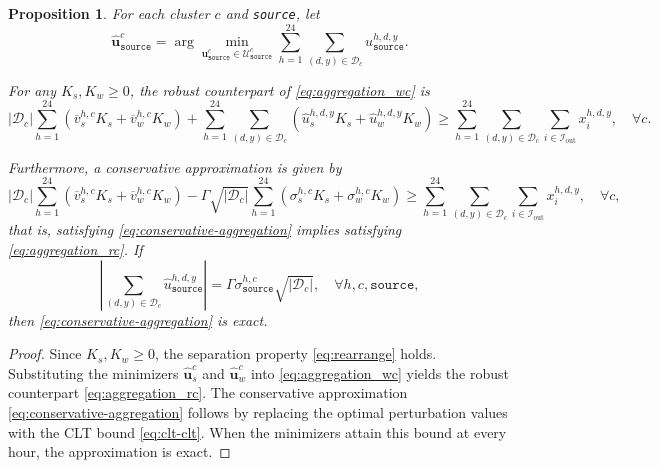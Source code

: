 \documentclass[10pt,a4paper]{amsart}
\newtheorem{proposition}{Proposition}
\begin{document}
\begin{proposition}\label{prop:rc-aggregation}
For each cluster $c$ and \texttt{source}, let
\begin{equation}\label{eq:closed-form}
    \boldsymbol{\hat{u}}^{c}_\texttt{source}
    =
    \arg\min_{\boldsymbol{u}^{c}_\texttt{source}\in\mathcal{U}^{c}_\texttt{source}}
    \sum_{h=1}^{24}\sum_{(d,y)\in\mathcal{D}_c}
    u_\texttt{source}^{h,d,y}.
\end{equation}

For any $K_s,K_w \ge 0$, the robust counterpart of
\eqref{eq:aggregation_wc} is
\begin{equation}\label{eq:aggregation_rc}
   |\mathcal{D}_c|
   \sum_{h=1}^{24}
   \left(
   \overline{v}_s^{h,c}K_s
   +
   \overline{v}_w^{h,c}K_w
   \right)
   +
   \sum_{h=1}^{24}\sum_{(d,y)\in\mathcal{D}_c}
   \left(
   \hat{u}_s^{h,d,y}K_s
   +
   \hat{u}_w^{h,d,y}K_w
   \right)
   \ge
   \sum_{h=1}^{24}\sum_{(d,y)\in\mathcal{D}_c}
   \sum_{i\in\mathcal{I}_{\mathrm{out}}}
   x_i^{h,d,y},
   \quad \forall c.
\end{equation}

Furthermore, a conservative approximation is given by
\begin{equation}\label{eq:conservative-aggregation}
    |\mathcal{D}_c|
    \sum_{h=1}^{24}
    \left(
    \overline{v}_s^{h,c}K_s
    +
    \overline{v}_w^{h,c}K_w
    \right)
    -
    \Gamma\sqrt{|\mathcal{D}_c|}
    \sum_{h=1}^{24}
    \left(
    \sigma_s^{h,c}K_s
    +
    \sigma_w^{h,c}K_w
    \right)
    \ge
    \sum_{h=1}^{24}\sum_{(d,y)\in\mathcal{D}_c}
    \sum_{i\in\mathcal{I}_{\mathrm{out}}}
    x_i^{h,d,y},
    \quad \forall c,
\end{equation}
that is, satisfying \eqref{eq:conservative-aggregation} implies satisfying \eqref{eq:aggregation_rc}. If
\[
\left|
\sum_{(d,y)\in\mathcal{D}_c}
\hat{u}^{h,d,y}_{\texttt{source}}
\right|
=
\Gamma
\sigma^{h,c}_{\texttt{source}}
\sqrt{|\mathcal{D}_c|},
\quad
\forall h,c,\texttt{source},
\]
then \eqref{eq:conservative-aggregation} is exact.
\end{proposition}

\begin{proof}
Since $K_s,K_w \ge 0$, the separation property
\eqref{eq:rearrange} holds. Substituting the minimizers
$\hat{\boldsymbol{u}}_s^c$ and $\hat{\boldsymbol{u}}_w^c$
into \eqref{eq:aggregation_wc} yields the robust counterpart
\eqref{eq:aggregation_rc}. The conservative approximation
\eqref{eq:conservative-aggregation} follows by replacing the optimal
perturbation values with the CLT bound \eqref{eq:clt-clt}. When the
minimizers attain this bound at every hour, the approximation is exact.
\end{proof}
\end{document}

